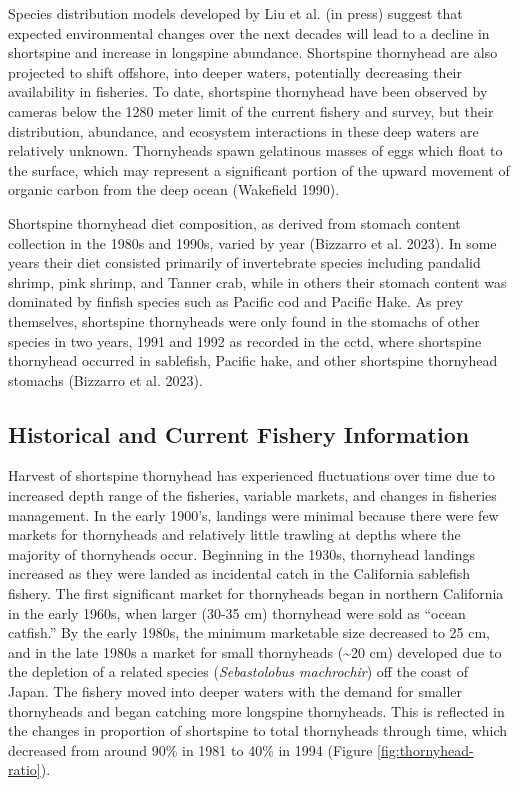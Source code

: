 \documentclass[11pt,
  english,
  letterpaper,
]{article}
\begin{document}
Species distribution models developed by Liu et al. (in press) suggest that expected environmental changes over the next decades will lead to a decline in shortspine and increase in longspine abundance. Shortspine thornyhead are also projected to shift offshore, into deeper waters, potentially decreasing their availability in fisheries. To date, shortspine thornyhead have been observed by cameras below the 1280 meter limit of the current fishery and survey, but their distribution, abundance, and ecosystem interactions in these deep waters are relatively unknown. Thornyheads spawn gelatinous masses of eggs which float to the surface, which may represent a significant portion of the upward movement of organic carbon from the deep ocean (Wakefield 1990).

Shortspine thornyhead diet composition, as derived from stomach content collection in the 1980s and 1990s, varied by year (Bizzarro et al. 2023). In some years their diet consisted primarily of invertebrate species including pandalid shrimp, pink shrimp, and Tanner crab, while in others their stomach content was dominated by finfish species such as Pacific cod and Pacific Hake. As prey themselves, shortspine thornyheads were only found in the stomachs of other species in two years, 1991 and 1992 as recorded in the \gls{cctd}, where shortspine thornyhead occurred in sablefish, Pacific hake, and other shortspine thornyhead stomachs (Bizzarro et al. 2023).

\hypertarget{historical-and-current-fishery-information}{%
\subsection{Historical and Current Fishery Information}\label{historical-and-current-fishery-information}}

Harvest of shortspine thornyhead has experienced fluctuations over time due to increased depth range of the fisheries, variable markets, and changes in fisheries management. In the early 1900's, landings were minimal because there were few markets for thornyheads and relatively little trawling at depths where the majority of thornyheads occur. Beginning in the 1930s, thornyhead landings increased as they were landed as incidental catch in the California sablefish fishery. The first significant market for thornyheads began in northern California in the early 1960s, when larger (30-35 cm) thornyhead were sold as ``ocean catfish.'' By the early 1980s, the minimum marketable size decreased to 25 cm, and in the late 1980s a market for small thornyheads (\textasciitilde20 cm) developed due to the depletion of a related species (\emph{Sebastolobus machrochir}) off the coast of Japan. The fishery moved into deeper waters with the demand for smaller thornyheads and began catching more longspine thornyheads. This is reflected in the changes in proportion of shortspine to total thornyheads through time, which decreased from around 90\% in 1981 to 40\% in 1994 (Figure \ref{fig:thornyhead-ratio}).
\end{document}
